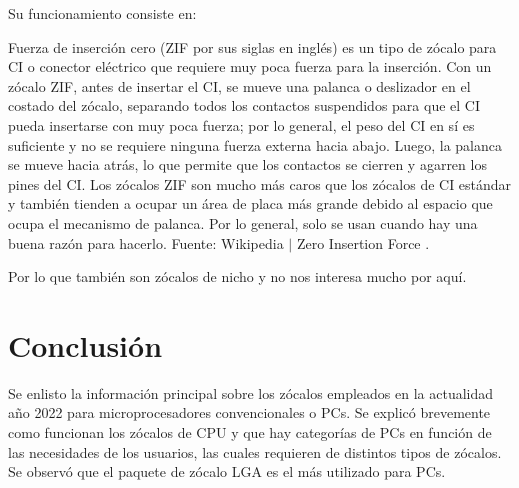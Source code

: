 \documentclass[conference]{IEEEtran}
\begin{document}
\bigbreak

Su funcionamiento consiste en:

\bigbreak

\begin{displayquote}
    Fuerza de inserción cero (ZIF por sus siglas en inglés) es un tipo de zócalo para CI o conector eléctrico que requiere muy poca fuerza para la inserción. Con un zócalo ZIF, antes de insertar el CI, se mueve una palanca o deslizador en el costado del zócalo, separando todos los contactos suspendidos para que el CI pueda insertarse con muy poca fuerza; por lo general, el peso del CI en sí es suficiente y no se requiere ninguna fuerza externa hacia abajo. Luego, la palanca se mueve hacia atrás, lo que permite que los contactos se cierren y agarren los pines del CI. Los zócalos ZIF son mucho más caros que los zócalos de CI estándar y también tienden a ocupar un área de placa más grande debido al espacio que ocupa el mecanismo de palanca. Por lo general, solo se usan cuando hay una buena razón para hacerlo.
    \small
    Fuente: Wikipedia $\mid$ Zero Insertion Force \cite{wikipedia-zif-2021}.
\end{displayquote}

\bigbreak

Por lo que también son zócalos de nicho y no nos interesa mucho por aquí.

\section{Conclusión}

Se enlisto la información principal sobre los zócalos empleados en la actualidad año 2022 para microprocesadores convencionales o PCs. Se explicó brevemente como funcionan los zócalos de CPU y que hay categorías de PCs en función de las necesidades de los usuarios, las cuales requieren de distintos tipos de zócalos. Se observó que el paquete de zócalo LGA es el más utilizado para PCs.

\printbibliography
\end{document}
